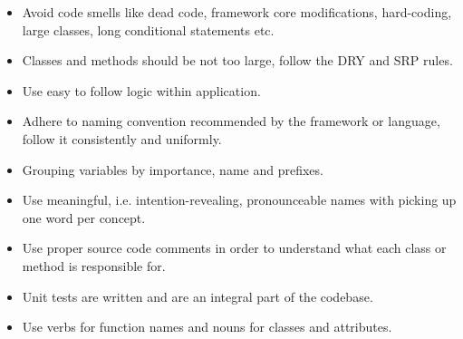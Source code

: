 \documentclass{article} %
\begin{document}
\begin{itemize}
    \item Avoid code smells like dead code, framework core modifications, hard-coding, large classes, long conditional statements etc.
    \item Classes and methods should be not too large, follow the DRY and SRP rules.
    \item Use easy to follow logic within application.
    \item Adhere to naming convention recommended by the framework or language, follow it consistently and uniformly.
    \item Grouping variables by importance, name and prefixes.
    \item Use meaningful, i.e. intention-revealing, pronounceable names with picking up one word per concept.
    \item Use proper source code comments in order to understand what each class or method is responsible for.
    \item Unit tests are written and are an integral part of the codebase.
    \item Use verbs for function names and nouns for classes and attributes.
\end{itemize}
\end{document}
